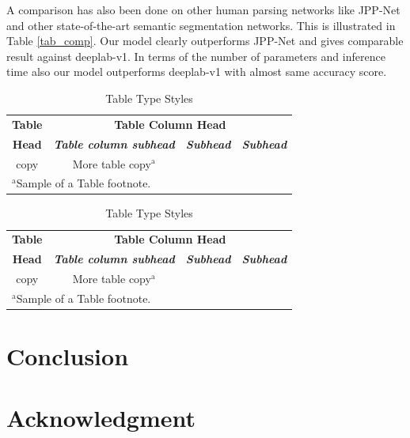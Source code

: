 \documentclass[conference]{IEEEtran}
\begin{document}
A comparison has also been done on other human parsing networks like JPP-Net and other state-of-the-art semantic segmentation networks. This is illustrated in Table \ref{tab_comp}. Our model clearly outperforms JPP-Net and gives comparable result against deeplab-v1. 
In terms of the number of parameters and inference time also our model outperforms deeplab-v1 with almost same accuracy score.

\begin{table}[htbp]
\caption{Table Type Styles}
\begin{center}
\begin{tabular}{|c|c|c|c|}
\hline
\textbf{Table}&\multicolumn{3}{|c|}{\textbf{Table Column Head}} \\
\cline{2-4} 
\textbf{Head} & \textbf{\textit{Table column subhead}}& \textbf{\textit{Subhead}}& \textbf{\textit{Subhead}} \\
\hline
copy& More table copy$^{\mathrm{a}}$& &  \\
\hline
\multicolumn{4}{l}{$^{\mathrm{a}}$Sample of a Table footnote.}
\end{tabular}
\label{tab1}
\end{center}
\end{table}


\begin{table}[htbp]
\caption{Table Type Styles}
\begin{center}
\begin{tabular}{|c|c|c|c|}
\hline
\textbf{Table}&\multicolumn{3}{|c|}{\textbf{Table Column Head}} \\
\cline{2-4} 
\textbf{Head} & \textbf{\textit{Table column subhead}}& \textbf{\textit{Subhead}}& \textbf{\textit{Subhead}} \\
\hline
copy& More table copy$^{\mathrm{a}}$& &  \\
\hline
\multicolumn{4}{l}{$^{\mathrm{a}}$Sample of a Table footnote.}
\end{tabular}
\label{tab1}
\end{center}
\end{table}

\section{Conclusion}

\section*{Acknowledgment}
\end{document}
